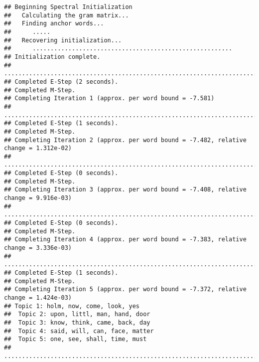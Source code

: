 \documentclass[
]{book}
\newenvironment{Shaded}{\begin{snugshade}}{\end{snugshade}}
\newcommand{\AttributeTok}[1]{\textcolor[rgb]{0.77,0.63,0.00}{#1}}
\newcommand{\DecValTok}[1]{\textcolor[rgb]{0.00,0.00,0.81}{#1}}
\newcommand{\FunctionTok}[1]{\textcolor[rgb]{0.00,0.00,0.00}{#1}}
\newcommand{\NormalTok}[1]{#1}
\newcommand{\OtherTok}[1]{\textcolor[rgb]{0.56,0.35,0.01}{#1}}
\newcommand{\SpecialCharTok}[1]{\textcolor[rgb]{0.00,0.00,0.00}{#1}}
\begin{document}
\begin{Shaded}
\end{Shaded}

\begin{verbatim}
## Beginning Spectral Initialization 
##   Calculating the gram matrix...
##   Finding anchor words...
##      .....
##   Recovering initialization...
##      ........................................................
## Initialization complete.
## ....................................................................................................
## Completed E-Step (2 seconds). 
## Completed M-Step. 
## Completing Iteration 1 (approx. per word bound = -7.581) 
## ....................................................................................................
## Completed E-Step (1 seconds). 
## Completed M-Step. 
## Completing Iteration 2 (approx. per word bound = -7.482, relative change = 1.312e-02) 
## ....................................................................................................
## Completed E-Step (0 seconds). 
## Completed M-Step. 
## Completing Iteration 3 (approx. per word bound = -7.408, relative change = 9.916e-03) 
## ....................................................................................................
## Completed E-Step (0 seconds). 
## Completed M-Step. 
## Completing Iteration 4 (approx. per word bound = -7.383, relative change = 3.336e-03) 
## ....................................................................................................
## Completed E-Step (1 seconds). 
## Completed M-Step. 
## Completing Iteration 5 (approx. per word bound = -7.372, relative change = 1.424e-03) 
## Topic 1: holm, now, come, look, yes 
##  Topic 2: upon, littl, man, hand, door 
##  Topic 3: know, think, came, back, day 
##  Topic 4: said, will, can, face, matter 
##  Topic 5: one, see, shall, time, must 
## ....................................................................................................

\end{verbatim}
\end{document}
